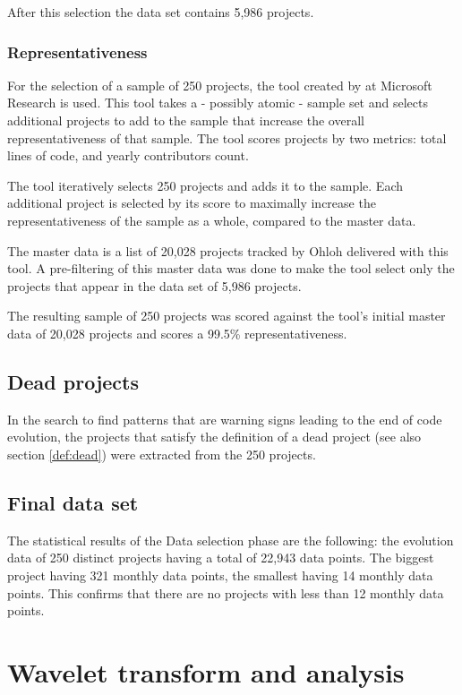 After this selection the data set contains 5,986 projects.

\subsubsection{Representativeness}
For the selection of a sample of 250 projects, the tool created by
\citet{nagappan} at Microsoft Research is used. This tool takes a - possibly
atomic - sample set and selects additional projects to add to the sample that
increase the overall representativeness of that sample. The tool scores
projects by two metrics: total lines of code, and yearly contributors count.

The tool iteratively selects 250 projects and adds it to the sample. Each
additional project is selected by its score to maximally increase the
representativeness of the sample as a whole, compared to the master data.

The master data is a list of 20,028 projects tracked by Ohloh delivered with
this tool. A pre-filtering of this master data was done to make the tool select
only the projects that appear in the data set of 5,986 projects.

The resulting sample of 250 projects was scored against the tool's initial
master data of 20,028 projects and scores a 99.5\%
representativeness.

\subsection{Dead projects}
In the search to find patterns that are warning signs leading to the end of
code evolution, the projects that satisfy the definition of a dead project (see
also section \ref{def:dead}) were extracted from the 250 projects.

\subsection{Final data set}
The statistical results of the Data selection phase are the following: the
evolution data of 250 distinct projects having a total of 22,943 data points.
The biggest project having 321 monthly data points, the smallest having 14
monthly data points. This confirms that there are no projects with less than 12
monthly data points.

\section{Wavelet transform and analysis}
